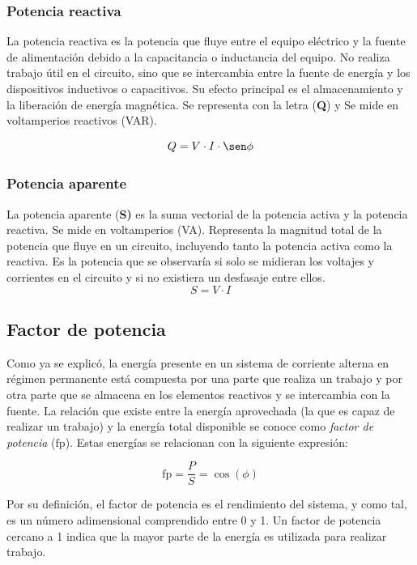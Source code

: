 \subsubsection{Potencia reactiva}
La potencia reactiva es la potencia que fluye entre el equipo eléctrico y la fuente de alimentación debido a la capacitancia o inductancia del equipo. No realiza trabajo útil en el circuito, sino que se intercambia entre la fuente de energía y los dispositivos inductivos o capacitivos. Su efecto principal es el almacenamiento y la liberación de energía magnética.
Se representa con la letra (\textbf{Q}) y Se mide en voltamperios reactivos (VAR).

\begin{equation}
    Q = V\cdot I\cdot\sen \phi
    \label{eq:visenphi}
\end{equation}

\subsubsection{Potencia aparente}
La potencia aparente (\textbf{S)} es la suma vectorial de la potencia activa y la potencia reactiva. Se mide en voltamperios (VA). Representa la magnitud total de la potencia que fluye en un circuito, incluyendo tanto la potencia activa como la reactiva. Es la potencia que se observaría si solo se midieran los voltajes y corrientes en el circuito y si no existiera un desfasaje entre ellos. 
\begin{equation}
    S= V \cdot I
\end{equation}

\subsection{Factor de potencia}
Como ya se explicó, la energía presente en un sistema
de corriente alterna en régimen permanente está compuesta por una parte
que realiza un trabajo y por otra parte que se almacena
en los elementos reactivos y se intercambia con la fuente. La relación que existe entre la energía aprovechada (la que es capaz de realizar un trabajo) y la energía total disponible se conoce como \textit{factor de potencia} ($\mathrm{fp}$). Estas energías se relacionan con la siguiente expresión:

\begin{equation}
    \mathrm{fp} = \frac{P}{S} = \cos(\phi)
\end{equation}

Por su definición, el factor de potencia es el rendimiento del sistema, y
como tal, es un número adimensional comprendido entre 0 y 1. Un factor de potencia cercano a 1 indica que la mayor parte de la energía es utilizada para realizar trabajo.

